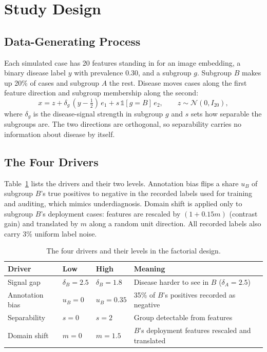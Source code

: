 \documentclass[conference]{IEEEtran}
\begin{document}
\section{Study Design}

\subsection{Data-Generating Process}
Each simulated case has 20 features standing in for an image embedding, a binary disease label $y$ with prevalence 0.30, and a subgroup $g$. Subgroup $B$ makes up 20\% of cases and subgroup $A$ the rest. Disease moves cases along the first feature direction and subgroup membership along the second:
\begin{equation}
x = z + \delta_g\,(y - \tfrac{1}{2})\,e_1 + s\,\mathbb{1}[g = B]\,e_2, \qquad z \sim \mathcal{N}(0, I_{20}),
\end{equation}
where $\delta_g$ is the disease-signal strength in subgroup $g$ and $s$ sets how separable the subgroups are. The two directions are orthogonal, so separability carries no information about disease by itself.

\subsection{The Four Drivers}
Table~\ref{tab:drivers} lists the drivers and their two levels. Annotation bias flips a share $u_B$ of subgroup $B$'s true positives to negative in the recorded labels used for training and auditing, which mimics underdiagnosis. Domain shift is applied only to subgroup $B$'s deployment cases: features are rescaled by $(1+0.15m)$ (contrast gain) and translated by $m$ along a random unit direction. All recorded labels also carry 3\% uniform label noise.

\begin{table}[t]
\centering
\caption{The four drivers and their levels in the factorial design.}
\label{tab:drivers}
\footnotesize
\begin{tabular}{@{}p{1.75cm}p{1.15cm}p{1.15cm}p{3.1cm}@{}}
\toprule
Driver & Low & High & Meaning \\
\midrule
Signal gap & $\delta_B{=}2.5$ & $\delta_B{=}1.8$ & Disease harder to see in $B$ ($\delta_A{=}2.5$) \\
Annotation bias & $u_B{=}0$ & $u_B{=}0.35$ & 35\% of $B$'s positives recorded as negative \\
Separability & $s{=}0$ & $s{=}2$ & Group detectable from features \\
Domain shift & $m{=}0$ & $m{=}1.5$ & $B$'s deployment features rescaled and translated \\
\bottomrule
\end{tabular}
\end{table}
\end{document}
